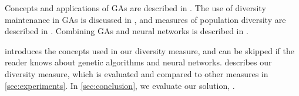 Concepts and applications of GAs are described in \cite{Cobb93geneticalgorithms,DeJong:1975:ABC:907087,Luke2013Metaheuristics,Syswerda:1989:UCG:645512.657265,ursem2002diversity,fogarty,Whitley:1989:GAS:93126.93169,1250187}.
The use of diversity maintenance in GAs is discussed in \cite{diaz2007empirical,Zitzler00comparisonof,Darwen00doesextra,1266373}, and measures of population diversity are described in \cite{Nguyen:2006:ASPGP,simpson1949measurement}.
Combining GAs and neural networks is described in \cite{masterThesisGANN}.

 introduces the concepts used in our diversity measure, and can be skipped if the reader knows about genetic algorithms and neural networks.  describes our diversity measure, which is evaluated and compared to other measures in \cref{sec:experiments}. In \cref{sec:conclusion}, we evaluate our solution, \dia.
